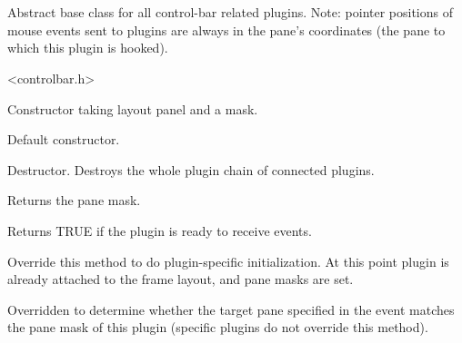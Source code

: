%
%


\section{}\label{cbpluginbase}


Abstract base class for all control-bar related plugins.
Note: pointer positions of mouse events sent to plugins
are always in the pane's coordinates (the pane to which
this plugin is hooked).




<controlbar.h>




\label{cbpluginbasecbpluginbase}


Constructor taking layout panel and a mask.



Default constructor.


\label{cbpluginbasedtor}


Destructor. Destroys the whole plugin chain of connected plugins.


\label{cbpluginbasegetpanemask}


Returns the pane mask.


\label{cbpluginbaseisready}


Returns TRUE if the plugin is ready to receive events.


\label{cbpluginbaseoninitplugin}


Override this method to do plugin-specific initialization.
At this point plugin is already attached to the frame layout,
and pane masks are set.


\label{cbpluginbaseprocessevent}


Overridden to determine whether the target pane specified in the
event matches the pane mask of this plugin (specific plugins
do not override this method).

